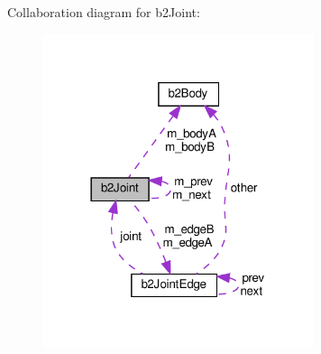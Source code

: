 Collaboration diagram for b2\+Joint\+:
\nopagebreak
\begin{figure}[H]
\begin{center}
\leavevmode
\includegraphics[width=225pt]{classb2Joint__coll__graph}
\end{center}
\end{figure}

